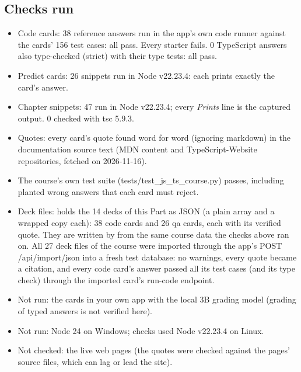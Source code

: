 \documentclass[10pt]{article}
\newcommand{\code}[1]{{\ttfamily\small #1}}
\begin{document}
\subsection*{Checks run}
{\footnotesize\begin{itemize}
\item Code cards: 38 reference answers run in the app's own code runner against the cards' 156 test cases: all pass. Every starter fails. 0 TypeScript answers also type-checked (strict) with their type tests: all pass.
\item Predict cards: 26 snippets run in Node v22.23.4: each prints exactly the card's answer.
\item Chapter snippets: 47 run in Node v22.23.4; every \textit{Prints} line is the captured output. 0 checked with tsc 5.9.3.
\item Quotes: every card's quote found word for word (ignoring markdown) in the documentation source text (MDN content and TypeScript-Website repositories, fetched on 2026-11-16).
\item The course's own test suite (\code{tests/test\_js\_ts\_course.py}) passes, including planted wrong answers that each card must reject.
\item Deck files:  holds the 14 decks of this Part as JSON (a plain array and a wrapped copy each): 38 code cards and 26 qa cards, each with its verified quote. They are written by  from the same course data the checks above ran on. All 27 deck files of the course were imported through the app's \code{POST /api/import/json} into a fresh test database: no warnings, every quote became a citation, and every code card's answer passed all its test cases (and its type check) through the imported card's run-code endpoint.
\item Not run: the cards in your own app with the local 3B grading model (grading of typed answers is not verified here).
\item Not run: Node 24 on Windows; checks used Node v22.23.4 on Linux.
\item Not checked: the live web pages (the quotes were checked against the pages' source files, which can lag or lead the site).
\end{itemize}}
\end{document}
